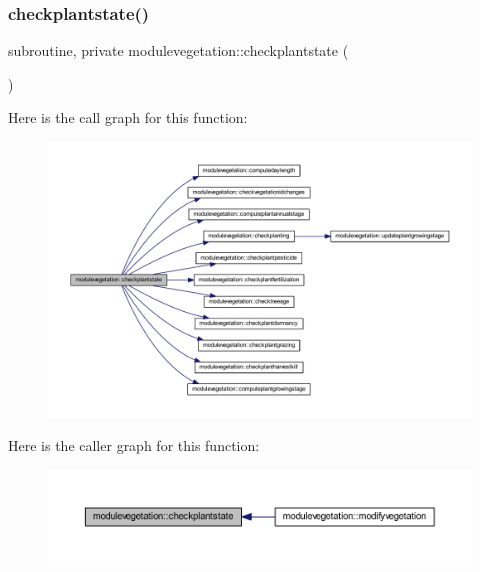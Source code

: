 \subsubsection{\texorpdfstring{checkplantstate()}{checkplantstate()}}
{\footnotesize\ttfamily subroutine, private modulevegetation\+::checkplantstate (\begin{DoxyParamCaption}{ }\end{DoxyParamCaption})\hspace{0.3cm}{\ttfamily [private]}}

Here is the call graph for this function\+:\nopagebreak
\begin{figure}[H]
\begin{center}
\leavevmode
\includegraphics[width=350pt]{namespacemodulevegetation_a37069c3859e6dc1812ad2ddda5ab49cd_cgraph}
\end{center}
\end{figure}
Here is the caller graph for this function\+:\nopagebreak
\begin{figure}[H]
\begin{center}
\leavevmode
\includegraphics[width=350pt]{namespacemodulevegetation_a37069c3859e6dc1812ad2ddda5ab49cd_icgraph}
\end{center}
\end{figure}
\mbox{\label{namespacemodulevegetation_adc2f366c1b31fc9c591f3d3be221f677}} 
